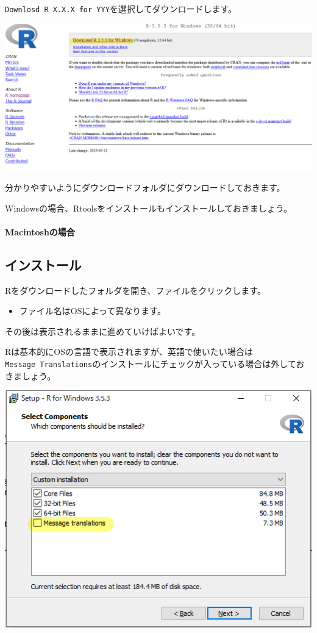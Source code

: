 \documentclass[]{bxjsreport}
\providecommand{\tightlist}{%
  \setlength{\itemsep}{0pt}\setlength{\parskip}{0pt}}
\let\oldparagraph\paragraph
\renewcommand{\paragraph}[1]{\oldparagraph{#1}\mbox{}}
\let\asdf\section
\renewcommand{\section}{\chapter}
\let\asdff\subsection
\renewcommand{\subsection}{\asdf}
\renewcommand{\subsubsection}{\asdff}
\begin{document}
\texttt{Downlosd\ R\ X.X.X\ for\ YYY}を選択してダウンロードします。

\includegraphics{figures/R5.jpg}

分かりやすいようにダウンロードフォルダにダウンロードしておきます。

Windowsの場合、Rtoolsをインストールもインストールしておきましょう。

\hypertarget{macintoshux306eux5834ux5408}{%
\paragraph{Macintoshの場合}\label{macintoshux306eux5834ux5408}}

\hypertarget{ux30a4ux30f3ux30b9ux30c8ux30fcux30eb}{%
\subsubsection{インストール}\label{ux30a4ux30f3ux30b9ux30c8ux30fcux30eb}}

Rをダウンロードしたフォルダを開き、ファイルをクリックします。

\begin{itemize}
\tightlist
\item
  ファイル名はOSによって異なります。
\end{itemize}

その後は表示されるままに進めていけばよいです。

Rは基本的にOSの言語で表示されますが、英語で使いたい場合は\texttt{Message\ Translations}のインストールにチェックが入っている場合は外しておきましょう。

\includegraphics{figures/R6.jpg}
\end{document}
